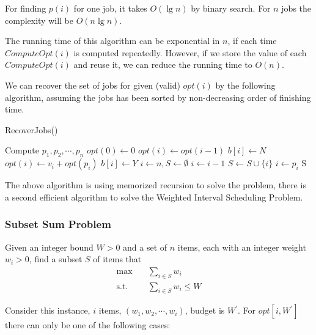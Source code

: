 						For finding $p(i)$ for one job, it takes $O(\lg n)$ by binary search. For $n$ jobs the complexity will be $O(n\lg n)$.

						The running time of this algorithm can be exponential in $n$, if each time $ComputeOpt(i)$ is computed repeatedly. However, if we store the value of each $ComputeOpt(i)$ and reuse it, we can reduce the running time to $O(n)$.

						We can recover the set of jobs for given (valid) $opt(i)$ by the following algorithm, assuming the jobs has been sorted by non-decreasing order of finishing time.
						\begin{algorithm}[h]
							\caption{RecoverJobs()}
							\begin{algorithmic}[1]
								\State Compute $p_1, p_2, \cdots, p_n$
								\State $opt(0) \gets 0$
								\For {$i \gets 1$ to $n$}
									\If {$opt(i - 1) \ge v_i + opt(p_i)$}
										\State $opt(i) \gets opt(i - 1)$
										\State $b[i] \gets N$								
									\Else
										\State $opt(i) \gets v_i + opt(p_i)$
										\State $b[i] \gets Y$
									\EndIf
								\EndFor
								\State $i \gets n, S\gets \emptyset$
								\While {$i \ne 0$}
									\If {$b[i] == N$}
										\State $i \gets i - 1$
									\Else
										\State $S \gets S \cup \{i\}$
										\State $i \gets p_i$
									\EndIf
								\EndWhile
								\State \Return S
							\end{algorithmic}
						\end{algorithm}

						The above algorithm is using memorized recursion to solve the problem, there is a second efficient algorithm to solve the Weighted Interval Scheduling Problem.

					\subsubsection{Subset Sum Problem}
						Given an integer bound $W > 0$ and a set of $n$ items, each with an integer weight $w_i > 0$, find a subset $S$ of items that
						\begin{align}
							\max \quad &\sum_{i \in S} w_i\\
							\text{s.t.} \quad & \sum_{i \in S} w_i \le W
						\end{align}

						Consider this instance, $i$ items, $(w_1, w_2, \cdots, w_i)$, budget is $W^\prime$. For $opt[i, W^\prime]$ there can only be one of the following cases:

